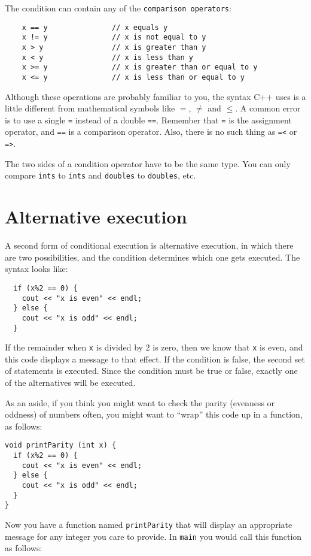 
The condition can contain any of the {\tt comparison operators}:

\begin{lstlisting}
    x == y               // x equals y
    x != y               // x is not equal to y
    x > y                // x is greater than y
    x < y                // x is less than y
    x >= y               // x is greater than or equal to y
    x <= y               // x is less than or equal to y
\end{lstlisting}
%
Although these operations are probably familiar to you, the
syntax C++ uses is a little different from mathematical
symbols like $=$, $\neq$ and $\le$.  A common error is
to use a single {\tt =} instead of a double {\tt ==}.  Remember
that {\tt =} is the assignment operator, and {\tt ==} is
a comparison operator.  Also, there is no such thing as
{\tt =<} or {\tt =>}.

The two sides of a condition operator have to be the same
type.  You can only compare {\tt ints} to {\tt ints} and
{\tt doubles} to {\tt doubles}, etc.  

\section {Alternative execution}
\label{alternative}

A second form of conditional execution is alternative execution,
in which there are two possibilities, and the condition determines
which one gets executed.  The syntax looks like:

\begin{lstlisting}
  if (x%2 == 0) {
    cout << "x is even" << endl;
  } else {
    cout << "x is odd" << endl;
  }
\end{lstlisting}
%
If the remainder when {\tt x} is divided by 2 is zero, then
we know that {\tt x} is even, and this code displays a message
to that effect.  If the condition is false, the second
set of statements is executed.  Since the condition must
be true or false, exactly one of the alternatives will be
executed.

As an aside, if you think you might want to check the parity
(evenness or oddness) of numbers often, you might want to
``wrap'' this code up in a function, as follows:

\begin{lstlisting}
void printParity (int x) {
  if (x%2 == 0) {
    cout << "x is even" << endl;
  } else {
    cout << "x is odd" << endl;
  }
}
\end{lstlisting}
%
Now you have a function named {\tt printParity} that will display
an appropriate message for any integer you care to provide.
In {\tt main} you would call this function as follows:

